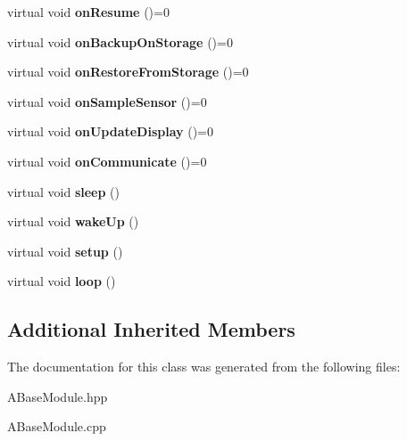 \begin{DoxyCompactItemize}
virtual void {\bfseries on\+Resume} ()=0
\item 
\mbox{\label{classwood_box_1_1module_1_1_a_base_module_aa0268bd48301ed644746df81be6d1e87}} 
virtual void {\bfseries on\+Backup\+On\+Storage} ()=0
\item 
\mbox{\label{classwood_box_1_1module_1_1_a_base_module_ae76a5f1f710290ea8d52204b38bcf0b2}} 
virtual void {\bfseries on\+Restore\+From\+Storage} ()=0
\item 
\mbox{\label{classwood_box_1_1module_1_1_a_base_module_ae66d1335fad9124b249d406734250adb}} 
virtual void {\bfseries on\+Sample\+Sensor} ()=0
\item 
\mbox{\label{classwood_box_1_1module_1_1_a_base_module_a77650bd8b4d90882a59d35b8d187db04}} 
virtual void {\bfseries on\+Update\+Display} ()=0
\item 
\mbox{\label{classwood_box_1_1module_1_1_a_base_module_a8ea3cf7772b85e3102a4e81ada7cf830}} 
virtual void {\bfseries on\+Communicate} ()=0
\item 
\mbox{\label{classwood_box_1_1module_1_1_a_base_module_ad3c13b77d3e8090925dbebf931182a32}} 
virtual void {\bfseries sleep} ()
\item 
\mbox{\label{classwood_box_1_1module_1_1_a_base_module_adbf081fe7add8b0b846da5dba707b590}} 
virtual void {\bfseries wake\+Up} ()
\item 
\mbox{\label{classwood_box_1_1module_1_1_a_base_module_af32f3a0cfbbf5461657b33fb8157b596}} 
virtual void {\bfseries setup} ()
\item 
\mbox{\label{classwood_box_1_1module_1_1_a_base_module_a675b70da3c3ea493293aaf6ed03f3aeb}} 
virtual void {\bfseries loop} ()
\end{DoxyCompactItemize}
\subsection*{Additional Inherited Members}


The documentation for this class was generated from the following files\+:\begin{DoxyCompactItemize}
\item 
A\+Base\+Module.\+hpp\item 
A\+Base\+Module.\+cpp\end{DoxyCompactItemize}
